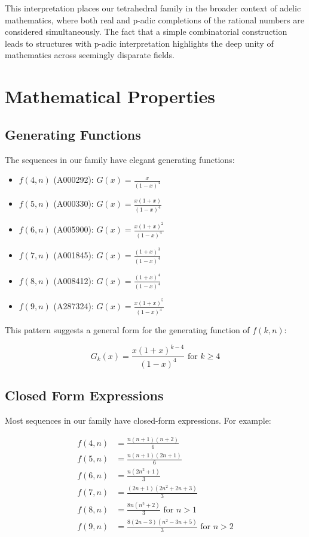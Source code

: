 \documentclass[12pt,a4paper]{article}
\begin{document}
This interpretation places our tetrahedral family in the broader context of adelic mathematics, where both real and p-adic completions of the rational numbers are considered simultaneously. The fact that a simple combinatorial construction leads to structures with p-adic interpretation highlights the deep unity of mathematics across seemingly disparate fields.

\section{Mathematical Properties}

\subsection{Generating Functions}

The sequences in our family have elegant generating functions:

\begin{itemize}
    \item $f(4,n)$ (A000292): $G(x) = \frac{x}{(1-x)^4}$
    \item $f(5,n)$ (A000330): $G(x) = \frac{x(1+x)}{(1-x)^4}$
    \item $f(6,n)$ (A005900): $G(x) = \frac{x(1+x)^2}{(1-x)^4}$
    \item $f(7,n)$ (A001845): $G(x) = \frac{(1+x)^3}{(1-x)^4}$
    \item $f(8,n)$ (A008412): $G(x) = \frac{(1+x)^4}{(1-x)^4}$
    \item $f(9,n)$ (A287324): $G(x) = \frac{x(1+x)^5}{(1-x)^4}$
\end{itemize}

This pattern suggests a general form for the generating function of $f(k,n)$:

\begin{equation}
G_k(x) = \frac{x(1+x)^{k-4}}{(1-x)^4} \text{ for } k \geq 4
\end{equation}

\subsection{Closed Form Expressions}

Most sequences in our family have closed-form expressions. For example:

\begin{align}
f(4,n) &= \frac{n(n+1)(n+2)}{6} \\
f(5,n) &= \frac{n(n+1)(2n+1)}{6} \\
f(6,n) &= \frac{n(2n^2+1)}{3} \\
f(7,n) &= \frac{(2n+1)(2n^2+2n+3)}{3} \\
f(8,n) &= \frac{8n(n^2+2)}{3} \text{ for } n > 1 \\
f(9,n) &= \frac{8(2n-3)(n^2-3n+5)}{3} \text{ for } n > 2
\end{align}
\end{document}
